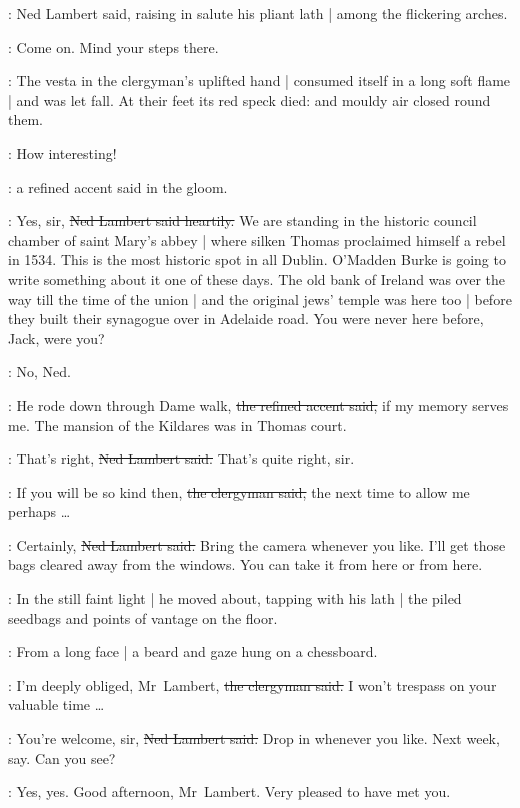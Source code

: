 :
Ned Lambert said,
raising in salute his pliant lath |
among the flickering arches.

\lambert:
Come on.
Mind your steps there.

:
The vesta in the clergyman's uplifted hand |
consumed itself in a long soft flame |
and was let fall.
At their feet
its red speck died:
and mouldy air
closed round them.

\revlove:
How interesting!

:
a refined accent said in the gloom.

\lambert:
Yes, sir,
\sout{Ned Lambert said heartily.}
We are standing in the historic council chamber of saint Mary's abbey |
where silken Thomas proclaimed himself a rebel in 1534.
This is the most historic spot in all Dublin.
O'Madden Burke is going to write something about it%
one of these days.
The old bank of Ireland was over the way
till the time of the union |
and the original jews' temple was here too |
before they built their synagogue over in Adelaide road.
You were never here before, Jack,
were you?

\jjom:
No, Ned.

\revlove:
He rode down through Dame walk,
\sout{the refined accent said,}
if my memory serves me.
The mansion of the Kildares was in Thomas court.

\lambert:
That's right,
\sout{Ned Lambert said.}
That's quite right, sir.

\revlove:
If you will be so kind then,
\sout{the clergyman said,}
the next time to allow
me perhaps \ldots

\lambert:
Certainly,
\sout{Ned Lambert said.}%
Bring the camera whenever you like.
I'll get those bags cleared away from the windows.
You can take it from here or from here.

:
In the still faint light |
he moved about,
tapping with his lath |
the piled seedbags and points of vantage on the floor.

\begin{interject}
    :
    From a long face |
    a beard and gaze hung on a chessboard.
\end{interject}

\revlove:
I'm deeply obliged, Mr~Lambert,
\sout{the clergyman said.}
I won't trespass on your valuable time \ldots

\lambert:
You're welcome, sir,
\sout{Ned Lambert said.}
Drop in whenever you like.
Next week, say.
Can you see?

\revlove:
Yes, yes.%
Good afternoon, Mr~Lambert.
Very pleased to have met you.

